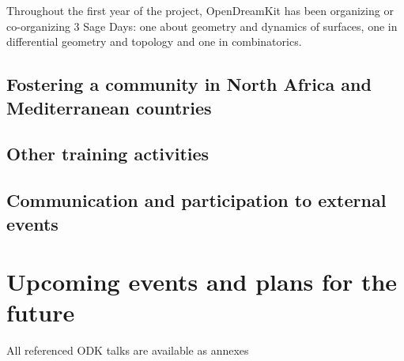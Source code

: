 \documentclass{../../Proposal/LaTeX-proposal/deliverablereport}
\begin{document}
Throughout the first year of the project, OpenDreamKit has been organizing or co-organizing
3 Sage Days: one about geometry and dynamics of surfaces, one in differential geometry and topology
 and one in combinatorics.







\subsection{Fostering a community in North Africa and Mediterranean countries}

\subsection{Other training activities}

\subsection{Communication and participation to external events}



















\section{Upcoming events and plans for the future}




\footnotesize{All referenced ODK talks are available as annexes}
\end{document}
